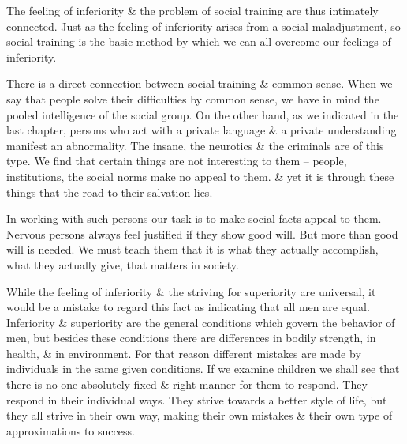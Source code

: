 \documentclass{article}
\begin{document}
The feeling of inferiority \& the problem of social training are thus intimately connected. Just as the feeling of inferiority arises from a social maladjustment, so social training is the basic method by which we can all overcome our feelings of inferiority.

There is a direct connection between social training \& common sense. When we say that people solve their difficulties by common sense, we have in mind the pooled intelligence of the social group. On the other hand, as we indicated in the last chapter, persons who act with a private language \& a private understanding manifest an abnormality. The insane, the neurotics \& the criminals are of this type. We find that certain things are not interesting to them -- people, institutions, the social norms make no appeal to them. \& yet it is through these things that the road to their salvation lies.

In working with such persons our task is to make social facts appeal to them. Nervous persons always feel justified if they show good will. But more than good will is needed. We must teach them that it is what they actually accomplish, what they actually give, that matters in society.

While the feeling of inferiority \& the striving for superiority are universal, it would be a mistake to regard this fact as indicating that all men are equal. Inferiority \& superiority are the general conditions which govern the behavior of men, but besides these conditions there are differences in bodily strength, in health, \& in environment. For that reason different mistakes are made by individuals in the same given conditions. If we examine children we shall see that there is no one absolutely fixed \& right manner for them to respond. They respond in their individual ways. They strive towards a better style of life, but they all strive in their own way, making their own mistakes \& their own type of approximations to success.
\end{document}
